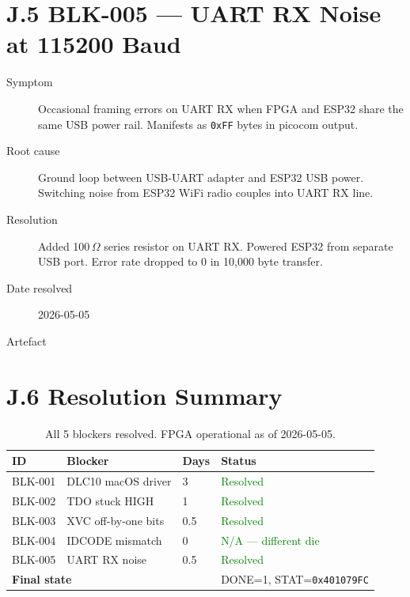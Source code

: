 \section*{J.5 BLK-005 --- UART RX Noise at 115200 Baud}
\label{sec:appJ-blk005}

\begin{description}
  \item[Symptom] Occasional framing errors on UART RX when FPGA and ESP32
    share the same USB power rail. Manifests as \texttt{0xFF} bytes in
    picocom output.
  \item[Root cause] Ground loop between USB-UART adapter and ESP32 USB
    power. Switching noise from ESP32 WiFi radio couples into UART RX line.
  \item[Resolution] Added 100\,$\Omega$ series resistor on UART RX. Powered
    ESP32 from separate USB port. Error rate dropped to 0 in 10,000 byte
    transfer.
  \item[Date resolved] 2026-05-05
  \item[Artefact] 
\end{description}

\section*{J.6 Resolution Summary}
\label{sec:appJ-summary}

\begin{table}[h]
\centering
\begin{tabular}{llll}
\toprule
\textbf{ID} & \textbf{Blocker} & \textbf{Days} & \textbf{Status} \\
\midrule
BLK-001 & DLC10 macOS driver & 3 & \textcolor{green}{Resolved} \\
BLK-002 & TDO stuck HIGH & 1 & \textcolor{green}{Resolved} \\
BLK-003 & XVC off-by-one bits & 0.5 & \textcolor{green}{Resolved} \\
BLK-004 & IDCODE mismatch & 0 & \textcolor{green}{N/A --- different die} \\
BLK-005 & UART RX noise & 0.5 & \textcolor{green}{Resolved} \\
\midrule
\multicolumn{2}{l}{\textbf{Final state}} & & DONE=1, STAT=\texttt{0x401079FC} \\
\bottomrule
\end{tabular}
\caption{All 5 blockers resolved. FPGA operational as of 2026-05-05.}
\end{table}

